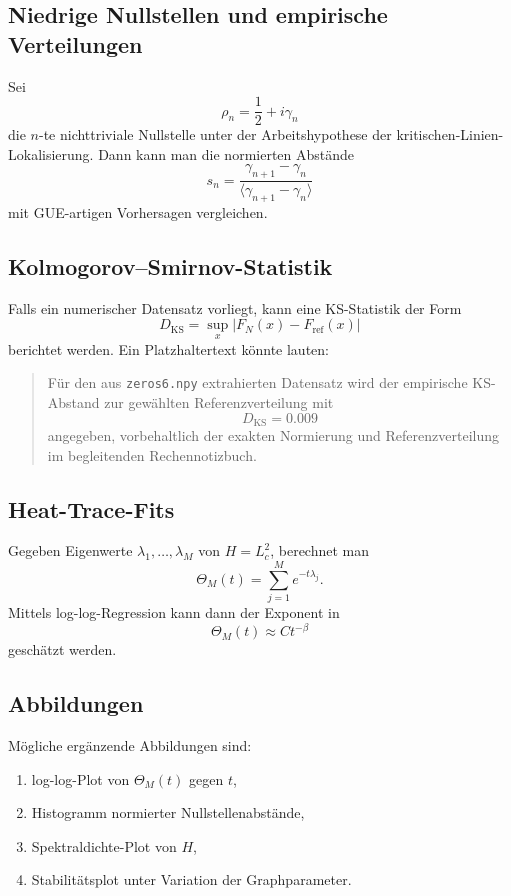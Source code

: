 \documentclass[11pt,a4paper]{amsart}
\theoremstyle{plain}
\theoremstyle{definition}
\theoremstyle{remark}
\newcommand{\ThetaH}{\Theta}
\newcommand{\Lc}{L_c}
\begin{document}
	\subsection{Niedrige Nullstellen und empirische Verteilungen}
	
	Sei
	\[
	\rho_n=\frac12+i\gamma_n
	\]
	die \(n\)-te nichttriviale Nullstelle unter der Arbeitshypothese der kritischen-Linien-Lokalisierung. Dann kann man die normierten Abstände
	\[
	s_n=\frac{\gamma_{n+1}-\gamma_n}{\langle \gamma_{n+1}-\gamma_n\rangle}
	\]
	mit GUE-artigen Vorhersagen vergleichen.
	
	\subsection{Kolmogorov--Smirnov-Statistik}
	
	Falls ein numerischer Datensatz vorliegt, kann eine KS-Statistik der Form
	\[
	D_{\mathrm{KS}}=\sup_x |F_N(x)-F_{\mathrm{ref}}(x)|
	\]
	berichtet werden. Ein Platzhaltertext könnte lauten:
	\begin{quote}
		Für den aus \texttt{zeros6.npy} extrahierten Datensatz wird der empirische KS-Abstand zur gewählten Referenzverteilung mit
		\[
		D_{\mathrm{KS}} = 0.009
		\]
		angegeben, vorbehaltlich der exakten Normierung und Referenzverteilung im begleitenden Rechennotizbuch.
	\end{quote}
	
	\subsection{Heat-Trace-Fits}
	
	Gegeben Eigenwerte \(\lambda_1,\dots,\lambda_M\) von \(H=\Lc^2\), berechnet man
	\[
	\ThetaH_M(t)=\sum_{j=1}^M e^{-t\lambda_j}.
	\]
	Mittels log-log-Regression kann dann der Exponent in
	\[
	\ThetaH_M(t)\approx C t^{-\beta}
	\]
	geschätzt werden.
	
	\subsection{Abbildungen}
	
	Mögliche ergänzende Abbildungen sind:
	\begin{enumerate}[label=\arabic*.]
		\item log-log-Plot von \(\ThetaH_M(t)\) gegen \(t\),
		\item Histogramm normierter Nullstellenabstände,
		\item Spektraldichte-Plot von \(H\),
		\item Stabilitätsplot unter Variation der Graphparameter.
	\end{enumerate}
	
\end{document}
